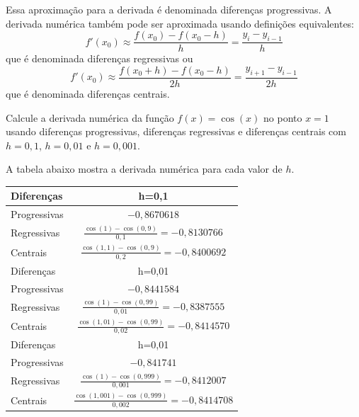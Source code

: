Essa aproximação para a derivada é denominada diferenças progressivas. A derivada numérica também pode ser aproximada usando definições equivalentes:
$$
f'(x_0)\approx \frac{f(x_0)-f(x_0-h)}{h}=\frac{y_i-y_{i-1}}{h}
$$
que é denominada diferenças regressivas ou
$$
f'(x_0)\approx \frac{f(x_0+h)-f(x_0-h)}{2h}=\frac{y_{i+1}-y_{i-1}}{2h}
$$
que é denominada diferenças centrais.
\begin{ex}
Calcule a derivada numérica da função $f(x)=\cos(x)$ no ponto $x=1$ usando diferenças progressivas, diferenças regressivas e diferenças centrais com $h=0,1$, $h=0,01$ e $h=0,001$.
\end{ex}
\begin{sol}
A tabela abaixo mostra a derivada numérica para cada valor de $h$.
\begin{center}
\begin{tabular}{|l|c|} \hline
  Diferenças & h=0,1 \\ \hline
  Progressivas & $\displaystyle -0,8670618$ \\
  Regressivas  & $\displaystyle \frac{\cos(1)-\cos(0,9)}{0,1} = -0,8130766$ \\
  Centrais     & $\displaystyle \frac{\cos(1,1)-\cos(0,9)}{0,2} = -0,8400692$ \\ \hline
  Diferenças & h=0,01 \\ \hline
  Progressivas & $\displaystyle -0,8441584$ \\
  Regressivas  & $\displaystyle \frac{\cos(1)-\cos(0,99)}{0,01} = -0,8387555$ \\
  Centrais     & $\displaystyle \frac{\cos(1,01)-\cos(0,99)}{0,02} = -0,8414570$ \\ \hline
  Diferenças & h=0,01 \\ \hline
  Progressivas & $\displaystyle -0,841741$ \\
  Regressivas  & $\displaystyle \frac{\cos(1)-\cos(0,999)}{0,001} = -0,8412007$ \\
  Centrais     & $\displaystyle \frac{\cos(1,001)-\cos(0,999)}{0,002} = -0,8414708$ \\ \hline
\end{tabular}  
\end{center}  
\end{sol}

